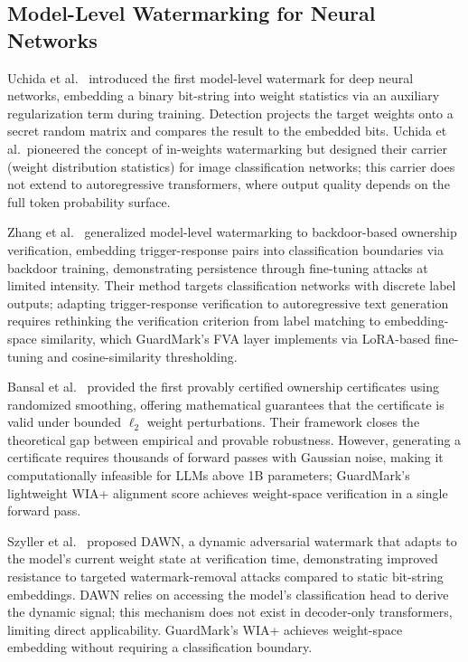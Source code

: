 \documentclass[journal,compsoc]{IEEEtran}
\begin{document}
\subsection{Model-Level Watermarking for Neural Networks}

Uchida et al.~\cite{uchida2017embedding} introduced the first model-level
watermark for deep neural networks, embedding a binary bit-string into weight
statistics via an auxiliary regularization term during training. Detection
projects the target weights onto a secret random matrix and compares the result
to the embedded bits. Uchida et al.\ pioneered the concept of in-weights
watermarking but designed their carrier (weight distribution statistics) for
image classification networks; this carrier does not extend to autoregressive
transformers, where output quality depends on the full token probability surface.

Zhang et al.~\cite{zhang2018protecting} generalized model-level watermarking
to backdoor-based ownership verification, embedding trigger-response pairs
into classification boundaries via backdoor training, demonstrating persistence
through fine-tuning attacks at limited intensity. Their method targets
classification networks with discrete label outputs; adapting trigger-response
verification to autoregressive text generation requires rethinking the
verification criterion from label matching to embedding-space similarity,
which GuardMark's FVA layer implements via LoRA-based fine-tuning and
cosine-similarity thresholding.

Bansal et al.~\cite{bansal2022certified} provided the first provably certified
ownership certificates using randomized smoothing, offering mathematical
guarantees that the certificate is valid under bounded $\ell_2$ weight
perturbations. Their framework closes the theoretical gap between empirical
and provable robustness. However, generating a certificate requires thousands
of forward passes with Gaussian noise, making it computationally infeasible
for LLMs above 1B parameters; GuardMark's lightweight WIA+ alignment score
achieves weight-space verification in a single forward pass.

Szyller et al.~\cite{szyller2021dawn} proposed DAWN, a dynamic adversarial
watermark that adapts to the model's current weight state at verification time,
demonstrating improved resistance to targeted watermark-removal attacks compared
to static bit-string embeddings. DAWN relies on accessing the model's
classification head to derive the dynamic signal; this mechanism does not
exist in decoder-only transformers, limiting direct applicability.
GuardMark's WIA+ achieves weight-space embedding without requiring a
classification boundary.
\end{document}
